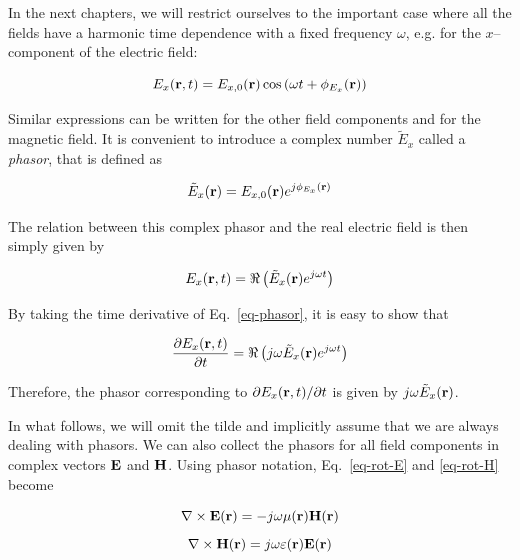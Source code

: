 In the next chapters, we will restrict ourselves to the important case where all
the fields have a harmonic time dependence with a fixed frequency $\omega$, e.g.
for the $x$--component of the electric field:

\begin{equation}
E_x({\bf r},t) = E_{x,0}({\bf r}) \cos \left( \omega t + \phi_{E_x} ({\bf r})
\right) \label{eq-phasor}
\end{equation}

Similar expressions can be written for the other field components and for the
magnetic field. It is convenient to introduce a complex number $\tilde{E}_x$
called a \emph{phasor}, that is defined as

\begin{equation}
\tilde{E}_x(\mathbf{r})=E_{x,0}({\bf r}) e^{j \phi_{E_x}({\bf r})}
\end{equation}

The relation between this complex phasor and the real electric field is then
simply given by

\begin{equation}
E_x({\bf r},t) = \Re \left(\tilde{E}_x({\bf r}) e^{j \omega t}\right)
\end{equation}

By taking the time derivative of Eq.~\ref{eq-phasor}, it is easy to show that 

\begin{equation}
\frac{\partial E_x({\bf r},t)}{\partial t} = \Re \left(j \omega \tilde{E}_x({\bf
r}) e^{j \omega t}\right)
\end{equation}

Therefore, the phasor corresponding to $\partial E_x({\bf r},t) / \partial t$ is
given by $j \omega \tilde{E}_x({\bf r})$.

In what follows, we will omit the tilde and implicitly assume that we are always
dealing with phasors. We can also collect the phasors for all field components
in complex vectors ${\bf E}$ and ${\bf H}$. Using phasor notation,
Eq.~\ref{eq-rot-E} and \ref{eq-rot-H} become

\begin{equation}
      \nabla \times {\bf E}({\bf r}) = - j \omega \mu({\bf r}) {\bf H}({\bf r})
\label{eq-rot-E-phas}
\end{equation}
\begin{equation}   
      \nabla \times {\bf H}({\bf r}) = j \omega \varepsilon({\bf r}) {\bf
E}({\bf r}) \label{eq-rot-H-phas}
\end{equation}

